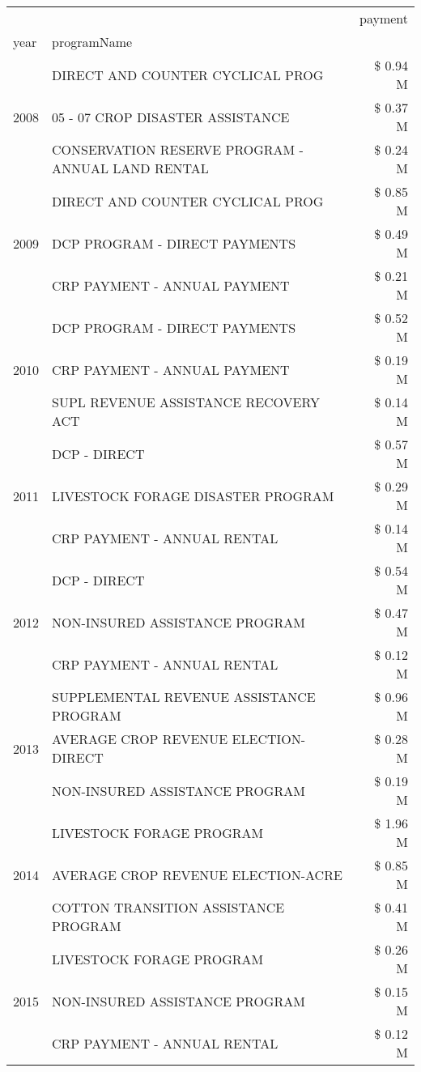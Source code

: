 \begin{tabular}{llr}
\toprule
 &  & payment \\
year & programName &  \\
\midrule
\multirow[t]{3}{*}{2008} & DIRECT AND COUNTER CYCLICAL PROG & \$ 0.94 M \\
 & 05 - 07 CROP DISASTER ASSISTANCE & \$ 0.37 M \\
 & CONSERVATION RESERVE PROGRAM - ANNUAL LAND RENTAL & \$ 0.24 M \\
\cline{1-3}
\multirow[t]{3}{*}{2009} & DIRECT AND COUNTER CYCLICAL PROG & \$ 0.85 M \\
 & DCP PROGRAM - DIRECT PAYMENTS & \$ 0.49 M \\
 & CRP PAYMENT - ANNUAL PAYMENT & \$ 0.21 M \\
\cline{1-3}
\multirow[t]{3}{*}{2010} & DCP PROGRAM - DIRECT PAYMENTS & \$ 0.52 M \\
 & CRP PAYMENT - ANNUAL PAYMENT & \$ 0.19 M \\
 & SUPL REVENUE ASSISTANCE RECOVERY ACT & \$ 0.14 M \\
\cline{1-3}
\multirow[t]{3}{*}{2011} & DCP - DIRECT & \$ 0.57 M \\
 & LIVESTOCK FORAGE DISASTER PROGRAM & \$ 0.29 M \\
 & CRP PAYMENT - ANNUAL RENTAL & \$ 0.14 M \\
\cline{1-3}
\multirow[t]{3}{*}{2012} & DCP - DIRECT & \$ 0.54 M \\
 & NON-INSURED ASSISTANCE PROGRAM & \$ 0.47 M \\
 & CRP PAYMENT - ANNUAL RENTAL & \$ 0.12 M \\
\cline{1-3}
\multirow[t]{3}{*}{2013} & SUPPLEMENTAL REVENUE ASSISTANCE PROGRAM & \$ 0.96 M \\
 & AVERAGE CROP REVENUE ELECTION-DIRECT & \$ 0.28 M \\
 & NON-INSURED ASSISTANCE PROGRAM & \$ 0.19 M \\
\cline{1-3}
\multirow[t]{3}{*}{2014} & LIVESTOCK FORAGE PROGRAM & \$ 1.96 M \\
 & AVERAGE CROP REVENUE ELECTION-ACRE & \$ 0.85 M \\
 & COTTON TRANSITION ASSISTANCE PROGRAM & \$ 0.41 M \\
\cline{1-3}
\multirow[t]{3}{*}{2015} & LIVESTOCK FORAGE PROGRAM & \$ 0.26 M \\
 & NON-INSURED ASSISTANCE PROGRAM & \$ 0.15 M \\
 & CRP PAYMENT - ANNUAL RENTAL & \$ 0.12 M \\

\end{tabular}
